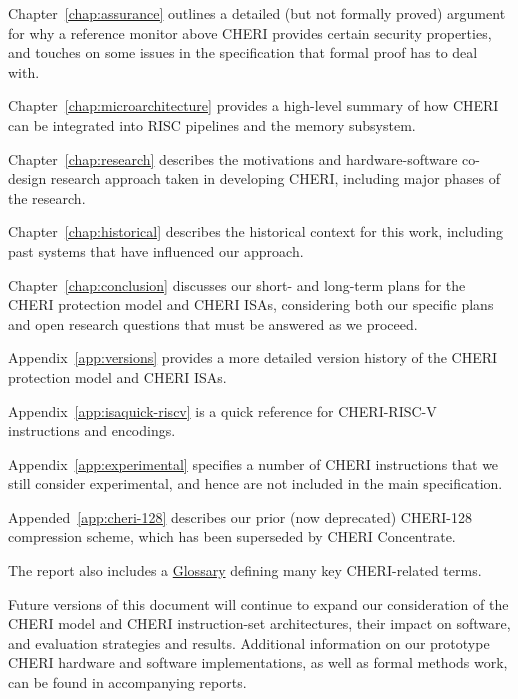 \medskip
\noindent
Chapter~\ref{chap:assurance} outlines a detailed (but not formally
proved) argument for
why a reference monitor above CHERI provides certain security
properties, and touches on some issues in the specification that
formal proof has to deal with.

\medskip
\noindent
Chapter~\ref{chap:microarchitecture} provides a high-level summary of how
CHERI can be integrated into RISC pipelines and the memory subsystem.

\medskip
\noindent
Chapter~\ref{chap:research} describes the motivations and hardware-software
co-design research approach taken in developing CHERI, including major phases of
the research.

\medskip
\noindent
Chapter~\ref{chap:historical} describes the historical context for this work,
including past systems that have influenced our approach.

\medskip
\noindent
Chapter~\ref{chap:conclusion} discusses our short- and long-term plans for the
CHERI protection model and CHERI ISAs, considering both our specific plans
and open research questions that must be answered as we proceed.

\medskip
\noindent
Appendix~\ref{app:versions} provides a more detailed version history of the
CHERI protection model and CHERI ISAs.

\medskip
\noindent
Appendix~\ref{app:isaquick-riscv} is a quick reference for CHERI-RISC-V
instructions and encodings.

\medskip
\noindent
Appendix~\ref{app:experimental} specifies a number of CHERI instructions
that we still consider experimental, and hence are not included in the main
specification.

\medskip
\noindent
Appended~\ref{app:cheri-128} describes our prior (now deprecated) CHERI-128
compression scheme, which has been superseded by CHERI Concentrate.

\medskip
\noindent
The report also includes a \hyperref[glossary]{Glossary} defining many key
CHERI-related terms.

\medskip

Future versions of this document will continue to expand our
consideration of the CHERI model and CHERI instruction-set architectures,
their impact on software, and evaluation strategies and results.
Additional information on our prototype CHERI hardware and software
implementations, as well as formal methods work, can be found in accompanying
reports.

